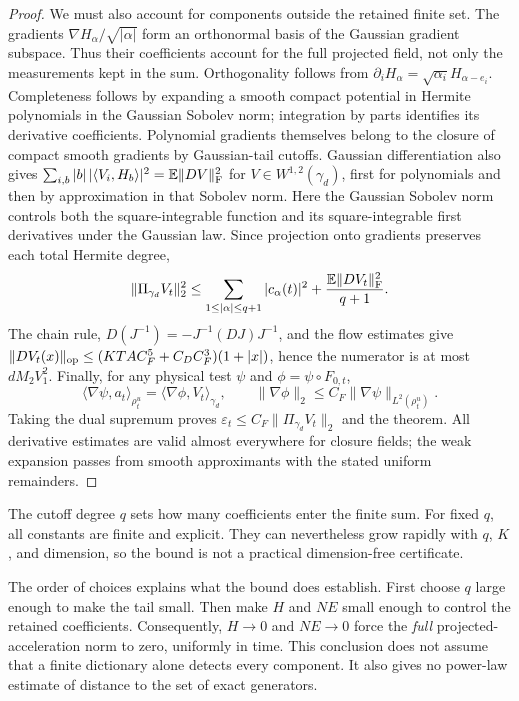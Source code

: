 \begin{proof}
We must also account for components outside the retained finite set.
The gradients $\nabla H_\alpha/\sqrt{|\alpha|}$ form an orthonormal basis
of the Gaussian gradient subspace. Thus their coefficients account for
the full projected field, not only the measurements kept in the sum. Orthogonality follows
from $\partial_iH_\alpha=\sqrt{\alpha_i}H_{\alpha-e_i}$.
Completeness follows by expanding a smooth compact potential in Hermite
polynomials in the Gaussian Sobolev norm; integration by parts identifies
its derivative coefficients. Polynomial gradients themselves belong to
the closure of compact smooth gradients by Gaussian-tail cutoffs.
Gaussian differentiation also gives
$\sum_{i,b}|b|\,|\langle V_i,H_b\rangle|^2=\mathbb E\|DV\|_{\mathrm F}^2$ for
$V\in W^{1,2}(\gamma_d)$, first for polynomials and then by approximation in that Sobolev norm. Here the Gaussian Sobolev norm
controls both the square-integrable function and its square-integrable first
derivatives under the Gaussian law.
Since projection onto gradients preserves each total Hermite degree,
\[
 \|\Pi_{\gamma_d}V_t\|_2^2
 \le\sum_{1\le|\alpha|\le q+1}|c_\alpha(t)|^2
       +\frac{\mathbb E\|DV_t\|_{\mathrm F}^2}{q+1}.
\]
The chain rule, $D(J^{-1})=-J^{-1}(DJ)J^{-1}$, and the flow estimates give
$\|DV_t(x)\|_{\rm op}\le (KTAC_F^5+C_D C_F^3)(1+|x|)$, hence the numerator
is at most $dM_2V_1^2$.
Finally, for any physical test $\psi$ and $\phi=\psi\circ F_{0,t}$,
\[
 \langle\nabla\psi,a_t\rangle_{\rho_t^u}
 =\langle\nabla\phi,V_t\rangle_{\gamma_d},\qquad
 \|\nabla\phi\|_2\le C_F\|\nabla\psi\|_{L^2(\rho_t^u)}.
\]
Taking the dual supremum proves
$\varepsilon_t\le C_F\|\Pi_{\gamma_d}V_t\|_2$ and the theorem.
All derivative estimates are valid almost everywhere for closure fields; the weak
expansion passes from smooth approximants with the stated uniform
remainders.
\end{proof}

The cutoff degree $q$ sets how many coefficients enter the finite sum.
For fixed $q$, all constants are finite and explicit. They can nevertheless
grow rapidly with $q$, $K$, and dimension, so the bound is not a practical
dimension-free certificate.

The order of choices explains what the bound does establish. First choose
$q$ large enough to make the tail small. Then make $H$ and $NE$ small
enough to control the retained coefficients. Consequently, $H\to0$ and
$NE\to0$ force the \emph{full} projected-acceleration norm to zero,
uniformly in time. This conclusion does not assume that a finite dictionary
alone detects every component. It also gives no power-law estimate of
distance to the set of exact generators.

